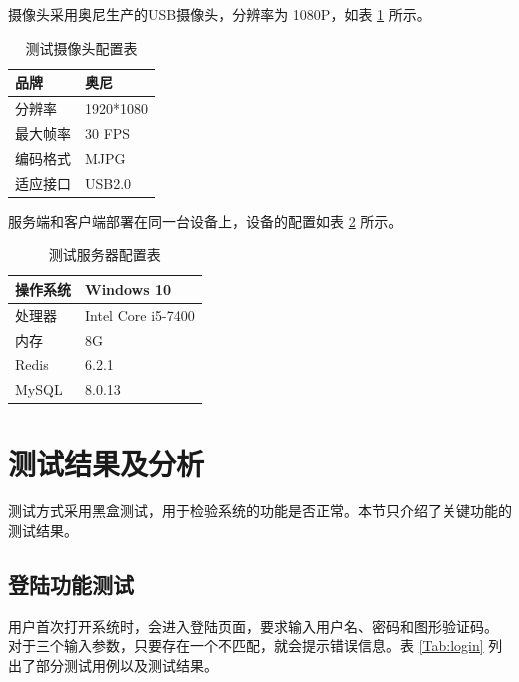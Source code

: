 摄像头采用奥尼生产的USB摄像头，分辨率为 1080P，如表 \ref{Tab:cam} 所示。
\begin{longtable}[ht]{|l|l|}
    \caption{测试摄像头配置表}
    \label{Tab:cam}
    \centering
    \hline
    品牌&奥尼\\
    \hline
    分辨率&1920*1080\\
    \hline
    最大帧率&30 FPS\\
    \hline
    编码格式&MJPG \\
    \hline
    适应接口&USB2.0\\
    \hline
    \end{longtable}

服务端和客户端部署在同一台设备上，设备的配置如表 \ref{Tab:conf} 所示。

\begin{longtable}[ht]{|l|l|}
\caption{测试服务器配置表}
\label{Tab:conf}
\centering
\hline
操作系统&Windows 10\\
\hline
处理器&Intel Core i5-7400\\
\hline
内存&8G\\
\hline
Redis&6.2.1 \\
\hline
MySQL&8.0.13\\
\hline
\end{longtable}

\section{测试结果及分析}
测试方式采用黑盒测试，用于检验系统的功能是否正常。本节只介绍了关键功能的测试结果。
\subsection{登陆功能测试}
用户首次打开系统时，会进入登陆页面，要求输入用户名、密码和图形验证码。
对于三个输入参数，只要存在一个不匹配，就会提示错误信息。表 \ref{Tab:login} 列出了部分测试用例以及测试结果。

